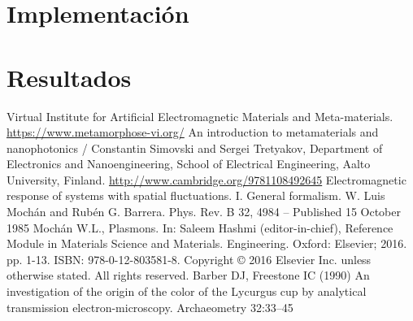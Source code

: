 \documentclass[12pt]{article}
\begin{document}
\section{Implementación}
\section{Resultados}

\begin{thebibliography}{0000}
 Virtual Institute for Artificial
  Electromagnetic Materials and
  Meta-materials. \url{https://www.metamorphose-vi.org/}
 An introduction
  to metamaterials and nanophotonics / Constantin Simovski and Sergei
  Tretyakov, Department of Electronics and Nanoengineering, School of
  Electrical Engineering, Aalto University,
  Finland. \url{http://www.cambridge.org/9781108492645}
  Electromagnetic response of systems with spatial
  fluctuations. I. General formalism. W. Luis Mochán and Rubén
  G. Barrera. Phys. Rev. B 32, 4984 – Published 15 October 1985
 Mochán W.L., Plasmons. In: Saleem Hashmi
  (editor-in-chief), Reference Module in Materials Science and
  Materials. Engineering. Oxford: Elsevier; 2016. pp. 1-13. ISBN:
  978-0-12-803581-8. Copyright © 2016 Elsevier Inc. unless otherwise
  stated. All rights reserved.
 Barber DJ, Freestone IC (1990) An
  investigation of the origin of the color of the Lycurgus cup by
  analytical transmission electron-microscopy. Archaeometry 32:33–45

  
  \end{thebibliography}
\end{document}
